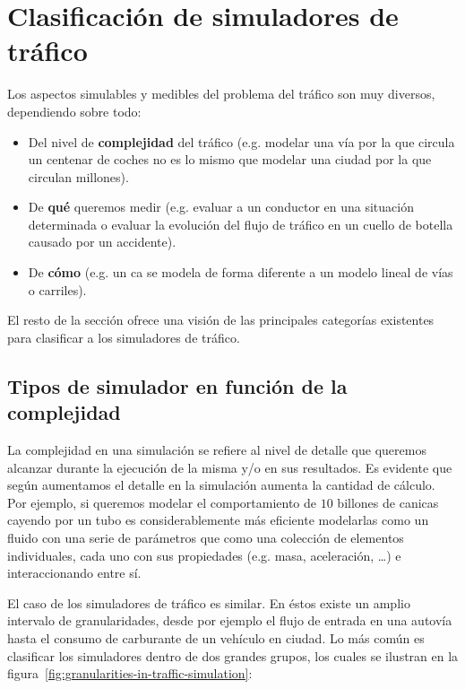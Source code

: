 \section{Clasificación de simuladores de tráfico}

Los aspectos simulables y medibles del problema del tráfico son muy diversos, dependiendo sobre todo:

\begin{itemize}
	\item Del nivel de \textbf{complejidad} del tráfico (e.g. modelar una vía por la que circula un centenar de coches no es lo mismo que modelar una ciudad por la que circulan millones).
	\item De \textbf{qué} queremos medir (e.g. evaluar a un conductor en una situación determinada o evaluar la evolución del flujo de tráfico en un cuello de botella causado por un accidente).
	\item De \textbf{cómo} (e.g. un \ac{ca} se modela de forma diferente a un modelo lineal de vías o carriles).
\end{itemize}

El resto de la sección ofrece una visión de las principales categorías existentes para clasificar a los simuladores de tráfico.

\subsection{Tipos de simulador en función de la complejidad}

La complejidad en una simulación se refiere al nivel de detalle que queremos alcanzar durante la ejecución de la misma y/o en sus resultados. Es evidente que según aumentamos el detalle en la simulación aumenta la cantidad de cálculo. Por ejemplo, si queremos modelar el comportamiento de $10$ billones de canicas cayendo por un tubo es considerablemente más eficiente modelarlas como un fluido con una serie de parámetros que como una colección de elementos individuales, cada uno con sus propiedades (e.g. masa, aceleración, \ldots) e interaccionando entre sí.

El caso de los simuladores de tráfico es similar. En éstos existe un amplio intervalo de granularidades, desde por ejemplo el flujo de entrada en una autovía hasta el consumo de carburante de un vehículo en ciudad. Lo más común es clasificar los simuladores dentro de dos grandes grupos, los cuales se ilustran en la figura~\ref{fig:granularities-in-traffic-simulation}:

